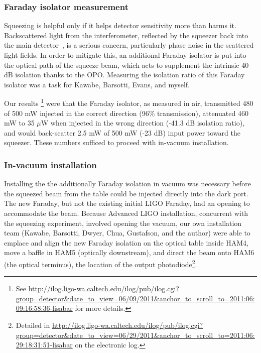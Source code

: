             \subsubsection{Faraday isolator measurement}
            \label{Faraday}



Squeezing is helpful only if it helps detector sensitivity more than harms it.
Backscattered light from the interferometer, reflected by the squeezer back into the main detector~\cite{ChuaThesis,BarsottiNatureSqueezing}, is a serious concern, particularly phase noise in the scattered light fields.
In order to mitigate this, an additional Faraday isolator is put into the optical path of the squeeze beam, which acts to supplement the intrinsic 40 dB isolation thanks to the OPO.
Measuring the isolation ratio of this Faraday isolator was a task for Kawabe, Barsotti, Evans, and myself.

Our results \footnote{See \url{http://ilog.ligo-wa.caltech.edu/ilog/pub/ilog.cgi?group=detector&date_to_view=06/09/2011&anchor_to_scroll_to=2011:06:09:16:58:36-lisabar} for more details.} were that the Faraday isolator, as measured in air, transmitted 480 of 500 mW injected in the correct direction (96\% transmission), attenuated 460 mW to 35 $\mu$W when injected in the wrong direction (-41.3 dB isolation ratio), and would back-scatter 2.5 mW of 500 mW (-23 dB) input power toward the squeezer. 
These numbers sufficed to proceed with in-vacuum installation.

            \subsubsection{In-vacuum installation}
            \label{In-vacuum}

Installing the the additionally Faraday isolation in vacuum was necessary before the squeezed beam from the table could be injected directly into the dark port.
The new Faraday, but not the existing initial LIGO Faraday, had an opening to accommodate the beam. 
Because Advanced LIGO installation, concurrent with the squeezing experiment, involved opening the vacuum, our own installation team (Kawabe, Barsotti, Dwyer, Chua, Gustafson, and the author) were able to emplace and align the new Faraday isolation on the optical table inside HAM4, move a baffle in HAM5 (optically downstream), and direct the beam onto HAM6 (the optical terminus), the location of the output photodiode\footnote{Detailed in \url{http://ilog.ligo-wa.caltech.edu/ilog/pub/ilog.cgi?group=detector&date_to_view=06/29/2011&anchor_to_scroll_to=2011:06:29:18:31:51-lisabar} on the electronic log.}.

